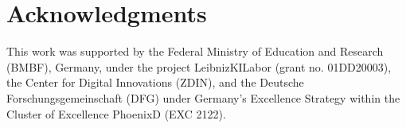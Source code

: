 \documentclass{article}
\begin{document}
\section*{Acknowledgments}
This work was supported by the Federal Ministry of Education and
Research (BMBF), Germany, under the project LeibnizKILabor (grant no.
01DD20003), the Center for Digital Innovations (ZDIN),
 and the Deutsche Forschungsgemeinschaft  (DFG)  under  Germany’s  Excellence  Strategy  within  the  Cluster of Excellence PhoenixD (EXC 2122).
 

{\small

}


\newpage

\end{document}
